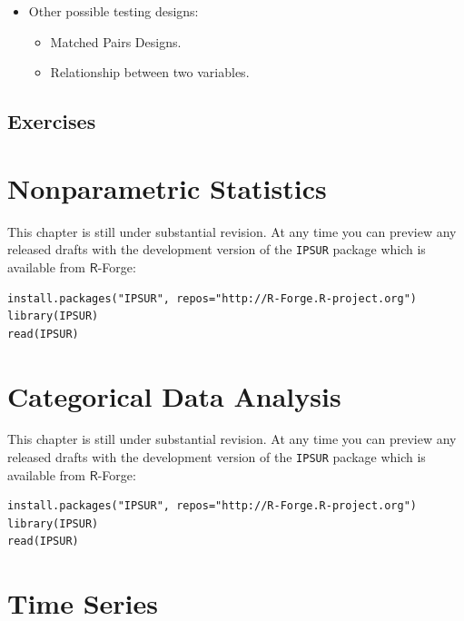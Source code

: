 \documentclass[captions=tableheading]{scrbook}
\begin{document}
\begin{example}
\begin{rem}
\end{rem}

\begin{itemize}
\item Other possible testing designs:
\begin{itemize}
\item Matched Pairs Designs.
\item Relationship between two variables.
\end{itemize}
\end{itemize}

\newpage{}
\section{Exercises}
\label{sec-13-5}

\setcounter{thm}{0}
\chapter{Nonparametric Statistics}
\label{sec-14}
\label{cha-Nonparametric-Statistics}


This chapter is still under substantial revision. At any time you can preview any released drafts with the development version of the \texttt{IPSUR} package which is available from \(\mathsf{R}\)-Forge:


\lstset{language=R}
\begin{lstlisting}
install.packages("IPSUR", repos="http://R-Forge.R-project.org")
library(IPSUR)
read(IPSUR)
\end{lstlisting}
\chapter{Categorical Data Analysis}
\label{sec-15}
\label{cha-Categorical-Data-Analysis}


This chapter is still under substantial revision. At any time you can preview any released drafts with the development version of the \texttt{IPSUR} package which is available from \(\mathsf{R}\)-Forge:


\lstset{language=R}
\begin{lstlisting}
install.packages("IPSUR", repos="http://R-Forge.R-project.org")
library(IPSUR)
read(IPSUR)
\end{lstlisting}
\chapter{Time Series}
\label{sec-16}
\label{cha-Time-Series}



\end{example}
\end{document}

